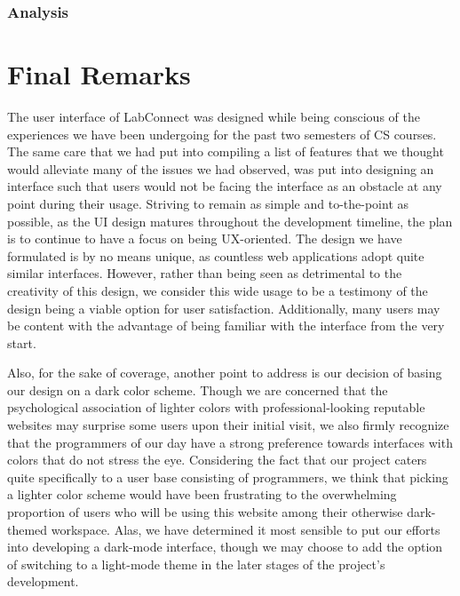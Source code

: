 \documentclass[a4paper, 12pt]{article}
\begin{document}
    \subsubsection{Analysis}
    
    
    
    \section{Final Remarks}
    
    The user interface of LabConnect was designed while being conscious of the experiences we have been undergoing for the past two semesters of CS courses.
    The same care that we had put into compiling a list of features that we thought would alleviate many of the issues we had observed,
    was put into designing an interface such that users would not be facing the interface as an obstacle at any point during their usage.
    Striving to remain as simple and to-the-point as possible, as the UI design matures throughout the development timeline, the plan is
    to continue to have a focus on being UX-oriented. The design we have formulated is by no means unique, as countless web applications adopt 
    quite similar interfaces. However, rather than being seen as detrimental to the creativity of this design, we consider this wide usage 
    to be a testimony of the design being a viable option for user satisfaction. Additionally, many users may be content with the advantage of
    being familiar with the interface from the very start. 
    
    Also, for the sake of coverage, another point to address is our decision of basing our design on a dark color scheme. Though we are concerned that the psychological association of
    lighter colors with professional-looking reputable websites may surprise some users upon their initial visit, we also firmly recognize that the programmers
    of our day have a strong preference towards interfaces with colors that do not stress the eye. Considering the fact that our project caters quite specifically to
    a user base consisting of programmers, we think that picking a lighter color scheme would have been frustrating to the overwhelming proportion of users who will
    be using this website among their otherwise dark-themed workspace. 
    Alas, we have determined it most sensible to put our efforts into developing a dark-mode interface, though we may choose to add the option of switching
    to a light-mode theme in the later stages of the project's development.
    
    
    
    
    \pagebreak
    \printbibliography
    
    
\end{document}

